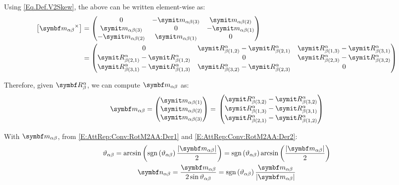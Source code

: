 Using \eqref{Eq.Def.V2Skew}, the above can be written element-wise as:
\begin{equation*}
	\begin{split}
		\vskew{\vrel{m}{\alpha}{\beta}} &=
		\begin{pmatrix}
			0							&-\crel{m}{\alpha}{\beta}{3}	&\crel{m}{\alpha}{\beta}{2}	\\
			\crel{m}{\alpha}{\beta}{3}	&0								&-\crel{m}{\alpha}{\beta}{1} \\
			-\crel{m}{\alpha}{\beta}{2}	&\crel{m}{\alpha}{\beta}{1}		&0
		\end{pmatrix} \\
		&= 
		\begin{pmatrix}
			0	&\cRotM{\alpha}{\beta}{1,2} - \cRotM{\alpha}{\beta}{2,1}	&\cRotM{\alpha}{\beta}{1,3} - \cRotM{\alpha}{\beta}{3,1} \\
			\cRotM{\alpha}{\beta}{2,1} - \cRotM{\alpha}{\beta}{1,2}		&0	&\cRotM{\alpha}{\beta}{2,3} - \cRotM{\alpha}{\beta}{3,2} \\
			\cRotM{\alpha}{\beta}{3,1} - \cRotM{\alpha}{\beta}{1,3}		&\cRotM{\alpha}{\beta}{3,2} - \cRotM{\alpha}{\beta}{2,3}	&0
		\end{pmatrix}
	\end{split}
\end{equation*}

Therefore, given $\RotM{\alpha}{\beta}$, we can compute $\vrel{m}{\alpha}{\beta}$ as:
\begin{equation} \label{E:AttRep:Conv:RotM2AA:Der0}
	\vrel{m}{\alpha}{\beta} = 
		\begin{pmatrix}
			\crel{m}{\alpha}{\beta}{1}	\\	\crel{m}{\alpha}{\beta}{2}	\\	\crel{m}{\alpha}{\beta}{3}
		\end{pmatrix} =
		\\
		\begin{pmatrix}
			\cRotM{\alpha}{\beta}{3,2} -\cRotM{\alpha}{\beta}{3,2} \\
			\cRotM{\alpha}{\beta}{1,3} -\cRotM{\alpha}{\beta}{3,1} \\
			\cRotM{\alpha}{\beta}{2,1} -\cRotM{\alpha}{\beta}{1,2}
		\end{pmatrix}
\end{equation}

With $\vrel{m}{\alpha}{\beta}$, from \eqref{E:AttRep:Conv:RotM2AA:Der1} and \eqref{E:AttRep:Conv:RotM2AA:Der2}:
\begin{gather*}
	\rel{\rotang}{\alpha}{\beta}= \arcsin \left( \sign{\rel{\rotang}{\alpha}{\beta}} \frac{\norm{\vrel{m}{\alpha}{\beta}}}{2} \right) =
	\sign{\rel{\rotang}{\alpha}{\beta}} \arcsin \left( \frac{\norm{\vrel{m}{\alpha}{\beta}}}{2} \right)
	\\
	\vrel{\rotax}{\alpha}{\beta} = \frac{\vrel{m}{\alpha}{\beta}}{2 \sin \rel{\rotang}{\alpha}{\beta}} =
	\sign{\rel{\rotang}{\alpha}{\beta}} \frac{\vrel{m}{\alpha}{\beta}}{\norm{\vrel{m}{\alpha}{\beta}}}
\end{gather*}

